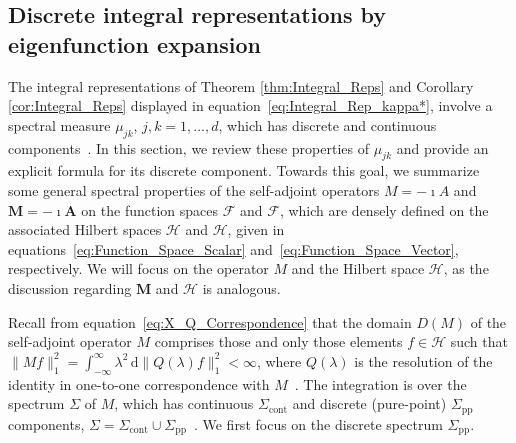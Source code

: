 \documentclass[leqno,onefignum,onetabnum]{siamltex1213}
\renewcommand{\d}{\mathrm{d}}
\newcommand{\Sigc}{\Sigma_{\text{cont}}}
\newcommand{\Sigp}{\Sigma_{\text{pp}}}
\newcommand{\Mb}{\mathbf{M}}
\newcommand{\Ab}{\mathbf{A}}
\newcommand{\Hc}{\mathcal{H}}
\newcommand{\Fc}{\mathcal{F}}
\newcommand{\Hs}{\mathscr{H}}
\newcommand{\Fs}{\mathscr{F}}
\begin{document}
\subsection{Discrete integral representations by eigenfunction
  expansion} \label{sec:Eig_Funct_Exp}  
%
The integral representations of Theorem \ref{thm:Integral_Reps} and
Corollary \ref{cor:Integral_Reps} 
displayed in equation~\eqref{eq:Integral_Rep_kappa*},  involve a
spectral measure $\mu_{jk}$, $j,k=1,\ldots,d$, which has discrete and
continuous components~\cite{Reed-1980,Stone:64}. In this section, we
review these properties of $\mu_{jk}$ and provide an explicit formula
for its discrete component. Towards this goal, 
we summarize some general spectral properties of the self-adjoint
operators $M=-\imath A$ and $\Mb=-\imath\Ab$ on the function spaces $\Fs$
and $\Fc$, which are densely defined on the associated Hilbert spaces $\Hs$
and $\Hc$, given in equations~\eqref{eq:Function_Space_Scalar}
and~\eqref{eq:Function_Space_Vector}, respectively. We will focus on the
operator $M$ and the Hilbert space $\Hs$, as the discussion regarding
$\Mb$ and $\Hc$ is analogous. 


Recall from equation~\eqref{eq:X_Q_Correspondence} that the domain
$D(M)$ of the self-adjoint operator $M$ comprises those and only those
elements $f\in\Hs$ such that $\|Mf\|_1^2=\int_{-\infty}^\infty\lambda^2\,\d\|Q(\lambda)f\|_1^2<\infty$,
where $Q(\lambda)$ is the resolution of the identity in one-to-one
correspondence with $M$~\cite{Stone:64}. The integration is over the
spectrum $\Sigma$ of $M$, which has continuous $\Sigc$ and discrete
(pure-point) $\Sigp$ components,
$\Sigma=\Sigc\cup\Sigp$~\cite{Reed-1980,Stone:64}. We first focus on
the discrete spectrum $\Sigp$.
\end{document}
